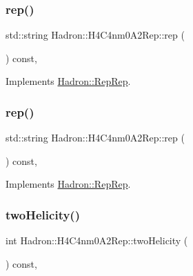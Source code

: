 \subsubsection{\texorpdfstring{rep()}{rep()}\hspace{0.1cm}{\footnotesize\ttfamily [4/5]}}
{\footnotesize\ttfamily std\+::string Hadron\+::\+H4\+C4nm0\+A2\+Rep\+::rep (\begin{DoxyParamCaption}{ }\end{DoxyParamCaption}) const\hspace{0.3cm}{\ttfamily [inline]}, {\ttfamily [virtual]}}



Implements \mbox{\hyperlink{structHadron_1_1RepRep_ab3213025f6de249f7095892109575fde}{Hadron\+::\+Rep\+Rep}}.

\mbox{\label{structHadron_1_1H4C4nm0A2Rep_a8da7c1c6f969806290e6452367fce7ea}} 
\subsubsection{\texorpdfstring{rep()}{rep()}\hspace{0.1cm}{\footnotesize\ttfamily [5/5]}}
{\footnotesize\ttfamily std\+::string Hadron\+::\+H4\+C4nm0\+A2\+Rep\+::rep (\begin{DoxyParamCaption}{ }\end{DoxyParamCaption}) const\hspace{0.3cm}{\ttfamily [inline]}, {\ttfamily [virtual]}}



Implements \mbox{\hyperlink{structHadron_1_1RepRep_ab3213025f6de249f7095892109575fde}{Hadron\+::\+Rep\+Rep}}.

\mbox{\label{structHadron_1_1H4C4nm0A2Rep_a347b2b7af8f9ebd8468f2de11f0b6894}} 
\subsubsection{\texorpdfstring{twoHelicity()}{twoHelicity()}\hspace{0.1cm}{\footnotesize\ttfamily [1/3]}}
{\footnotesize\ttfamily int Hadron\+::\+H4\+C4nm0\+A2\+Rep\+::two\+Helicity (\begin{DoxyParamCaption}{ }\end{DoxyParamCaption}) const\hspace{0.3cm}{\ttfamily [inline]}, {\ttfamily [virtual]}}


